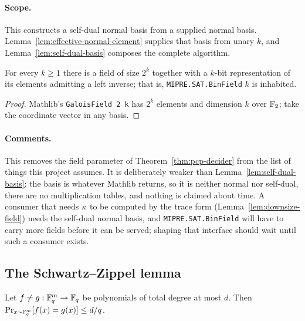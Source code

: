 \paragraph{Scope.} This constructs a self-dual normal basis from a supplied normal
basis. Lemma~\ref{lem:effective-normal-element} supplies that basis from unary $k$,
and Lemma~\ref{lem:self-dual-basis} composes the complete algorithm.

\begin{lemma}
\label{lem:admissible-field-exists}
\leanok
For every $k \geq 1$ there is a field of size $2^k$ together with a $k$-bit representation of
its elements admitting a left inverse; that is, \texttt{MIPRE.SAT.BinField} $k$ is inhabited.
\end{lemma}

\begin{proof}
\leanok
Mathlib's \texttt{GaloisField 2 k} has $2^k$ elements and dimension $k$ over $\mathbb{F}_2$; take the
coordinate vector in any basis.
\end{proof}

\paragraph{Comments.} This removes the field parameter of Theorem~\ref{thm:pcp-decider} from the
list of things this project assumes. It is deliberately weaker than
Lemma~\ref{lem:self-dual-basis}: the basis is whatever Mathlib returns, so it is neither normal
nor self-dual, there are no multiplication tables, and nothing is claimed about time. A consumer
that needs $\kappa$ to be computed by the trace form (Lemma~\ref{lem:downsize-field}) needs
the self-dual normal basis, and \texttt{MIPRE.SAT.BinField} will have to carry more fields
before it can be served; shaping that interface should wait until such a consumer exists.

\subsection{The Schwartz--Zippel lemma}
\label{sec:rr-schwartz-zippel}

\effortMathlib

\begin{lemma}
\label{lem:schwartz-zippel}
\leanok
Let $f \neq g : \mathbb{F}_q^m \to \mathbb{F}_q$ be polynomials of total degree at most $d$. Then
$\Pr_{x \sim \mathbb{F}_q^m}[ f(x) = g(x) ] \leq d/q$.
\end{lemma}

